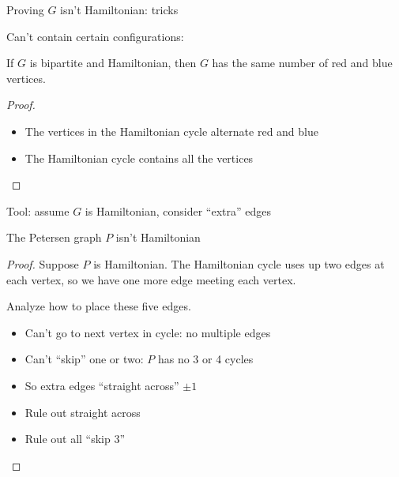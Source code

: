 \documentclass{beamer}
\begin{document}
\begin{frame}{Proving $G$ isn't Hamiltonian: tricks}
  \begin{block}{Can't contain certain configurations:}
\begin{center}    
\end{center}
\end{block}
  \begin{lemma}If $G$ is bipartite and Hamiltonian, then $G$ has the same number of red and blue vertices.
    \end{lemma}
    \begin{proof}
      \begin{itemize}
      \item          The vertices in the Hamiltonian cycle alternate red and blue
        \item The Hamiltonian cycle contains all the vertices
\end{itemize}
      \end{proof}  

\end{frame}
\begin{frame}{Tool: assume $G$ is Hamiltonian, consider ``extra'' edges}
  \begin{theorem}The Petersen graph $P$ isn't Hamiltonian
  \end{theorem}

  \begin{proof}
    Suppose $P$ is Hamiltonian.  The Hamiltonian cycle uses up two edges at each vertex, so we have one more edge meeting each vertex.

\begin{block}{Analyze how to place these five edges.}
    \begin{itemize}
    \item Can't go to next vertex in cycle: no multiple edges
    \item Can't ``skip'' one or two: $P$ has no 3 or 4 cycles
    \item So extra edges ``straight across'' $\pm 1$ 
    \item Rule out straight across
    \item Rule out all ``skip 3''
        \end{itemize}
\end{block}
\end{proof}
\end{frame}
\end{document}
